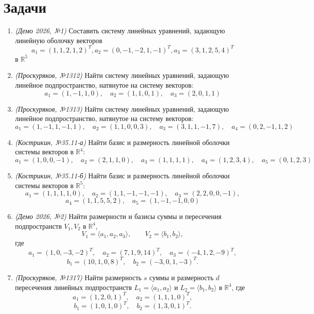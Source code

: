 \section*{Задачи}

\begin{enumerate}
    \item \textit{(Демо 2026, №1)} Составить систему линейных уравнений, задающую линейную оболочку векторов 
    \[
    a_1 = (1, 1, 2, 1, 2)^T, a_2 = (0, -1, -2, 1, -1)^T, a_3 = (3, 1, 2, 5, 4)^T
    \]    
    в $\mathbb{R}^5$

    \item \textit{(Проскуряков, №1312)} Найти систему линейных уравнений, задающую линейное подпространство, натянутое на систему векторов:
    \[
    a_1 = (1, -1, 1, 0), \quad a_2 = (1, 1, 0, 1), \quad a_3 = (2, 0, 1, 1)
    \]

    \item \textit{(Проскуряков, №1313)} Найти систему линейных уравнений, задающую линейное подпространство, натянутое на систему векторов:
    \[
    a_1 = (1, -1, 1, -1, 1), \quad a_2 = (1, 1, 0, 0, 3), \quad a_3 = (3, 1, 1, -1, 7), \quad a_4 = (0, 2, -1, 1, 2)
    \]

    \item \textit{(Кострикин, №35.11-а)} Найти базис и размерность линейной оболочки системы векторов в $\mathbb{R}^4$:
    \[
    a_1 = (1, 0, 0, -1), \quad a_2 = (2, 1, 1, 0), \quad a_3 = (1, 1, 1, 1), \quad a_4 = (1, 2, 3, 4), \quad a_5 = (0, 1, 2, 3)
    \]

    \item \textit{(Кострикин, №35.11-б)} Найти базис и размерность линейной оболочки системы векторов в $\mathbb{R}^5$:
    \[
    a_1 = (1, 1, 1, 1, 0), \quad a_2 = (1, 1, -1, -1, -1), \quad a_3 = (2, 2, 0, 0, -1),
    \]
    \[
    a_4 = (1, 1, 5, 5, 2), \quad a_5 = (1, -1, -1, 0, 0)
    \]


    \item \textit{(Демо 2026, №2)} Найти размерности и базисы суммы и пересечения подпространств $V_1, V_2$ в $\mathbb{R}^4$,
    \[
    V_1 = \langle a_1, a_2, a_3 \rangle,\qquad
    V_2 = \langle b_1, b_2 \rangle,
    \]
    где
    \[
    a_1 = (1, 0, -3, -2)^T,\quad
    a_2 = (7, 1, 9, 14)^T,\quad
    a_3 = (-4, 1, 2, -9)^T,
    \]
    \[
    b_1 = (10, 1, 0, 8)^T,\quad
    b_2 = (-3, 0, 1, -3)^T.
    \]

    \item \textit{(Проскуряков, №1317)} Найти размерность $s$ суммы и размерность $d$ пересечения линейных подпространств $L_1 = \langle a_1, a_2 \rangle$ и $L_2 = \langle b_1, b_2 \rangle$ в $\mathbb{R}^4$, где
    \[
    a_1 = (1, 2, 0, 1)^T, \quad a_2 = (1, 1, 1, 0)^T,
    \]
    \[
    b_1 = (1, 0, 1, 0)^T, \quad b_2 = (1, 3, 0, 1)^T.
    \]


\end{enumerate}
